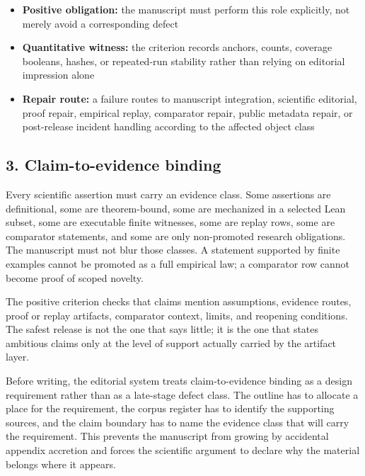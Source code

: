 \begin{itemize}[leftmargin=1.8em]

\item \textbf{Positive obligation:} the manuscript must perform this role explicitly, not merely avoid a corresponding defect

\item \textbf{Quantitative witness:} the criterion records anchors, counts, coverage booleans, hashes, or repeated-run stability rather than relying on editorial impression alone

\item \textbf{Repair route:} a failure routes to manuscript integration, scientific editorial, proof repair, empirical replay, comparator repair, public metadata repair, or post-release incident handling according to the affected object class

\end{itemize}

\subsection{3. Claim-to-evidence binding}

Every scientific assertion must carry an evidence class. Some assertions are definitional, some are theorem-bound, some are mechanized in a selected Lean subset, some are executable finite witnesses, some are replay rows, some are comparator statements, and some are only non-promoted research obligations. The manuscript must not blur those classes. A statement supported by finite examples cannot be promoted as a full empirical law; a comparator row cannot become proof of scoped novelty.


The positive criterion checks that claims mention assumptions, evidence routes, proof or replay artifacts, comparator context, limits, and reopening conditions. The safest release is not the one that says little; it is the one that states ambitious claims only at the level of support actually carried by the artifact layer.


Before writing, the editorial system treats claim-to-evidence binding as a design requirement rather than as a late-stage defect class. The outline has to allocate a place for the requirement, the corpus register has to identify the supporting sources, and the claim boundary has to name the evidence class that will carry the requirement. This prevents the manuscript from growing by accidental appendix accretion and forces the scientific argument to declare why the material belongs where it appears.


